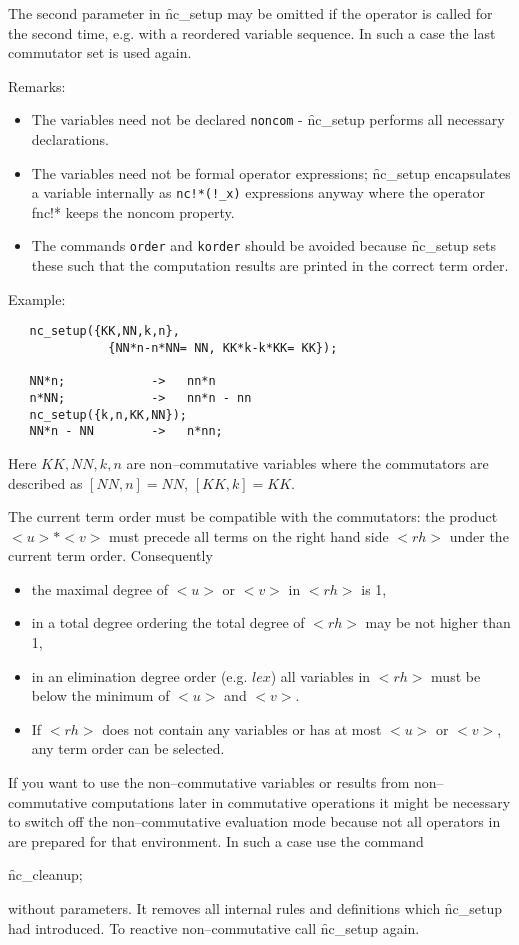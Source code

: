 The second parameter in \f{nc\_setup} may be
omitted if the operator is called for the second time,
e.g. with a reordered variable sequence. In such a case
the last commutator set is used again.

Remarks: \begin{itemize}
\item The variables need not be declared \texttt{noncom} -
    \f{nc\_setup} performs all necessary declarations.
\item The variables need not be formal operator expressions;
    \f{nc\_setup} encapsulates a variable  internally
    as \texttt{nc!*(!\_x)} expressions anyway where the operator f{nc!*}
    keeps the noncom property.
\item The commands \texttt{order} and \texttt{korder} should be avoided
    because \f{nc\_setup} sets these such that the computation
    results are printed in the correct term order.
\end{itemize}

Example:
\begin {verbatim}
   nc_setup({KK,NN,k,n},
              {NN*n-n*NN= NN, KK*k-k*KK= KK});

   NN*n;            ->   nn*n
   n*NN;            ->   nn*n - nn
   nc_setup({k,n,KK,NN});
   NN*n - NN        ->   n*nn;

\end{verbatim}
Here $KK,NN,k,n$ are non--commutative variables where
the commutators are described as $[NN,n]=NN$, $[KK,k]=KK$.

The current term order must be compatible with the commutators:
the product $<u>*<v>$ must precede all terms on the right hand
side $<rh>$ under the current term order. Consequently
\begin{itemize}
\item the maximal degree of $<u>$ or $<v>$ in $<rh>$ is 1,
\item in a total degree ordering the total degree of $<rh>$ may be
not higher than 1,
\item in an elimination degree order (e.g. $lex$) all variables in
$<rh>$ must be below the minimum of $<u>$ and $<v>$.
\item If $<rh>$ does not contain any variables or has at most $<u>$ or
$<v>$, any term order can be selected.
\end{itemize}

\hypertarget{operator:NC_CLEANUP}{}
If you want to use the non--commutative variables or results from
non--commutative computations later in commutative operations
it might be necessary to switch off the non--commutative
evaluation mode because not
all operators in \REDUCE are prepared for that environment. In
such a case use the command
\begin{syntax}
    \f{nc\_cleanup};
\end{syntax}
without parameters. It removes all internal rules and definitions
which \f{nc\_setup} had introduced. To reactive non--commutative
call \f{nc\_setup} again.

